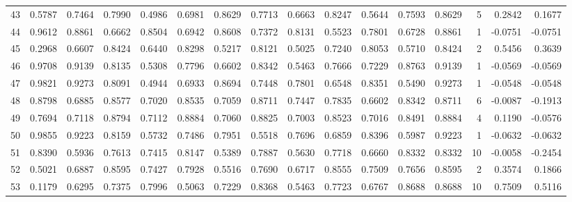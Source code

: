 \begin{tabular}{lrrrrrrrrrrrrrrr}
43  &      0.5787 &  0.7464 &  0.7990 &  0.4986 &  0.6981 &  0.8629 &  0.7713 &  0.6663 &  0.8247 &  0.5644 &   0.7593 &     0.8629 &      5 &                    0.2842 &                     0.1677 \\
44  &      0.9612 &  0.8861 &  0.6662 &  0.8504 &  0.6942 &  0.8608 &  0.7372 &  0.8131 &  0.5523 &  0.7801 &   0.6728 &     0.8861 &      1 &                   -0.0751 &                    -0.0751 \\
45  &      0.2968 &  0.6607 &  0.8424 &  0.6440 &  0.8298 &  0.5217 &  0.8121 &  0.5025 &  0.7240 &  0.8053 &   0.5710 &     0.8424 &      2 &                    0.5456 &                     0.3639 \\
46  &      0.9708 &  0.9139 &  0.8135 &  0.5308 &  0.7796 &  0.6602 &  0.8342 &  0.5463 &  0.7666 &  0.7229 &   0.8763 &     0.9139 &      1 &                   -0.0569 &                    -0.0569 \\
47  &      0.9821 &  0.9273 &  0.8091 &  0.4944 &  0.6933 &  0.8694 &  0.7448 &  0.7801 &  0.6548 &  0.8351 &   0.5490 &     0.9273 &      1 &                   -0.0548 &                    -0.0548 \\
48  &      0.8798 &  0.6885 &  0.8577 &  0.7020 &  0.8535 &  0.7059 &  0.8711 &  0.7447 &  0.7835 &  0.6602 &   0.8342 &     0.8711 &      6 &                   -0.0087 &                    -0.1913 \\
49  &      0.7694 &  0.7118 &  0.8794 &  0.7112 &  0.8884 &  0.7060 &  0.8825 &  0.7003 &  0.8523 &  0.7016 &   0.8491 &     0.8884 &      4 &                    0.1190 &                    -0.0576 \\
50  &      0.9855 &  0.9223 &  0.8159 &  0.5732 &  0.7486 &  0.7951 &  0.5518 &  0.7696 &  0.6859 &  0.8396 &   0.5987 &     0.9223 &      1 &                   -0.0632 &                    -0.0632 \\
51  &      0.8390 &  0.5936 &  0.7613 &  0.7415 &  0.8147 &  0.5389 &  0.7887 &  0.5630 &  0.7718 &  0.6660 &   0.8332 &     0.8332 &     10 &                   -0.0058 &                    -0.2454 \\
52  &      0.5021 &  0.6887 &  0.8595 &  0.7427 &  0.7928 &  0.5516 &  0.7690 &  0.6717 &  0.8555 &  0.7509 &   0.7656 &     0.8595 &      2 &                    0.3574 &                     0.1866 \\
53  &      0.1179 &  0.6295 &  0.7375 &  0.7996 &  0.5063 &  0.7229 &  0.8368 &  0.5463 &  0.7723 &  0.6767 &   0.8688 &     0.8688 &     10 &                    0.7509 &                     0.5116 \\

\end{tabular}

